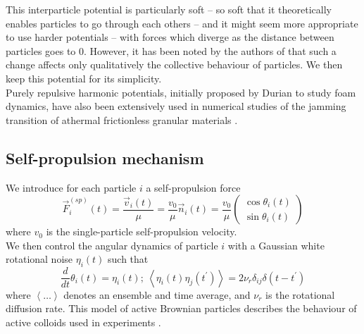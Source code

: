 \documentclass[class=report, float=false, crop=false]{standalone}
\begin{document}
This interparticle potential is particularly soft -- so soft that it theoretically enables particles to go through each others -- and it might seem more appropriate to use harder potentials -- with forces which diverge as the distance between particles goes to 0. However, it has been noted by the authors of \cite{fily2014freezing} that such a change affects only qualitatively the collective behaviour of particles. We then keep this potential for its simplicity.\\

Purely repulsive harmonic potentials, initially proposed by Durian \cite{durian1995foam} to study foam dynamics, have also been extensively used in numerical studies of the jamming transition of athermal frictionless granular materials \cite{o2003jamming, olsson2007critical}.

\subsection{Self-propulsion mechanism}
\label{subsection:self_propulsion_mechanism}


We introduce for each particle $i$ a self-propulsion force
\begin{equation}
\vec{F}^{(sp)}_i(t) = \frac{\vec{v}_i(t)}{\mu} = \frac{v_0}{\mu}\vec{n}_i(t) = \frac{v_0}{\mu}\begin{pmatrix}\cos\theta_i(t)\\\sin\theta_i(t)\end{pmatrix}
\label{self_propulsion}
\end{equation}
where $v_0$ is the single-particle self-propulsion velocity.\\

We then control the angular dynamics of particle $i$ with a Gaussian white rotational noise $\eta_i(t)$ such that
\begin{equation}
\frac{d}{dt}\theta_i(t) = \eta_i(t);~ \left<\eta_i(t)\eta_j(t^{\prime})\right> = 2\nu_r\delta_{ij}\delta(t - t^{\prime})
\label{rotational_noise_correlation}
\end{equation}
where $\left<\ldots\right>$ denotes an ensemble and time average, and $\nu_r$ is the rotational diffusion rate. This model of active Brownian particles \cite{romanczuk2012active} describes the behaviour of active colloids used in experiments \cite{buttinoni2013dynamical, howse2007self, bialke2015active, theurkauff2012dynamic}.\\
\end{document}
